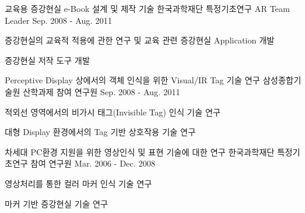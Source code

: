 \begin{cventries}
  \cventry
    {교육용 증강현실 e-Book 설계 및 제작 기술} %
    {한국과학재단 특정기초연구} %
    {AR Team Leader} %
    {Sep. 2008 - Aug. 2011} %
    {
      \begin{cvitems} %
        \item {증강현실의 교육적 적용에 관한 연구 및 교육 관련 증강현실 Application 개발}
        \item {증강현실 저작 도구 개발}
      \end{cvitems}
    }

  \cventry
    {Perceptive Display 상에서의 객체 인식을 위한 Visual/IR Tag 기술 연구} %
    {삼성종합기술원 산학과제} %
    {참여 연구원} %
    {Sep. 2008 - Aug. 2011} %
    {
      \begin{cvitems} %
        \item {적외선 영역에서의 비가시 태그(Invisible Tag) 인식 기술 연구}
        \item {대형 Display 환경에서의 Tag 기반 상호작용 기술 연구}
      \end{cvitems}
    }

  \cventry
    {차세대 PC환경 지원을 위한 영상인식 및 표현 기술에 대한 연구} %
    {한국과학재단 특정기초연구} %
    {참여 연구원} %
    {Mar. 2006 - Dec. 2008} %
    {
      \begin{cvitems} %
        \item {영상처리를 통한 컬러 마커 인식 기술 연구}
        \item {마커 기반 증강현실 기술 연구}
      \end{cvitems}
    }
\end{cventries}
